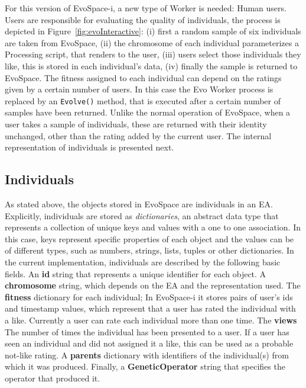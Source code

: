 \documentclass{sig-alternate}
\begin{document}
For this version of EvoSpace-i, a new type of Worker is needed: Human users. Users are responsible for evaluating the quality of individuals, the process is depicted in Figure~\ref{fig:evoInteractive}: (i) first a random sample of six individuals are taken from EvoSpace, (ii) the chromosome of each individual parameterizes a Processing script, that renders to the user, (iii) users select those individuals they like, this is stored in each individual's data, (iv) finally the sample is returned to EvoSpace. The fitness assigned to each individual can depend on the ratings given by a certain number of users. In this case the Evo Worker process is replaced  by an \texttt{Evolve()} method, that is executed after a certain number of samples have been returned.
Unlike the normal operation of EvoSpace, when a user takes a sample of individuals, these are returned with their identity unchanged, other than the rating added by the current user. The internal representation of individuals is presented next.

\subsection{Individuals} %
As stated above, the objects stored in EvoSpace are individuals in an EA.
Explicitly, individuals are stored as \emph{dictionaries}, an abstract data type that represents a collection of unique keys and values with a one to one association. In this case, keys represent specific properties of each object and the values can be of different types, such as
numbers, strings, lists, tuples or other dictionaries.
In the current implementation, individuals are described by the following basic fields.
An \textbf{id} string that represents a unique identifier for each object.
A \textbf{chromosome} string, which depends on the EA and the representation used.
The \textbf{fitness} dictionary for each individual; In EvoSpace-i it stores pairs of user's ids and timestamp values, which represent that a user has rated the individual with a like. Currently a user can rate each individual more than one time.
The \textbf{views} The number of times the individual has been presented to a user. If a user has seen an individual and  did not assigned it a like, this can be used as a probable not-like rating.
A \textbf{parents} dictionary with identifiers of the individual(s) from which it was produced.
Finally, a \textbf{GeneticOperator}  string that specifies the operator that produced it.
\end{document}
